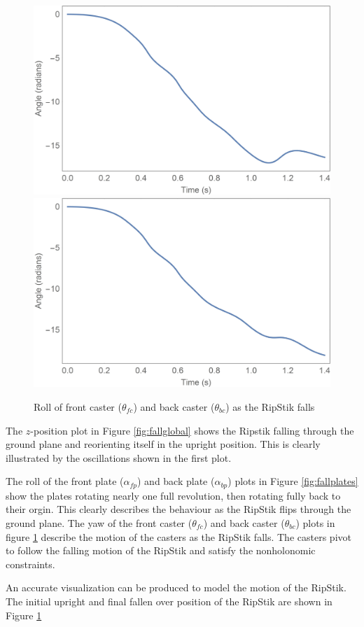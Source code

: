 \begin{figure}[!htb]
	\centering
	\includegraphics[width=\linewidth]{fallthetafc}
	\endminipage\hspace{1em}%
	\includegraphics[width=\linewidth]{fallthetabc}
	\endminipage
	\caption{Roll of front caster ($\theta_{fc}$) and back caster ($\theta_{bc}$) as the RipStik falls}\label{fig:fallcaster}	
\end{figure}

The $z$-position plot in Figure \ref{fig:fallglobal} shows the Ripstik falling through the ground plane and reorienting itself in the upright position. 
This is clearly illustrated by the oscillations shown in the first plot.


The roll of the front plate ($\alpha_{fp}$) and back plate ($\alpha_{bp}$) plots in Figure \ref{fig:fallplates} show the plates rotating nearly one full revolution, then rotating fully back to their orgin. 
This clearly describes the behaviour as the RipStik flips through the ground plane.
The yaw of the front caster ($\theta_{fc}$) and back caster ($\theta_{bc}$) plots in figure \ref{fig:fallcaster} describe the motion of the casters as the RipStik falls.
The casters pivot to follow the falling motion of the RipStik and satisfy the nonholonomic constraints.
\par
An accurate visualization can be produced to model the motion of the RipStik. The initial upright and final fallen over position of the RipStik are shown in Figure \ref{fig:fallcaster}

